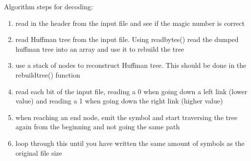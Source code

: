 \documentclass[11pt]{article}
\begin{document}
Algorithm steps for decoding:
\begin{enumerate}
\item read in the header from the input file and see if the magic number is correct
\item read Huffman tree from the input file. Using readbytes() read the dumped huffman tree into an array and use it to rebuild the tree
\item use a stack of nodes to reconstruct Huffman tree. This should be done in the rebuildtree() function
\item read each bit of the input file, reading a 0 when going down a left link (lower value) and reading a 1 when going down the right link (higher value)
\item when reaching an end node, emit the symbol and start traversing the tree again from the beginning and not going the same path
\item loop through this until you have written the same amount of symbols as the original file size
\end{enumerate}
\end{document}
